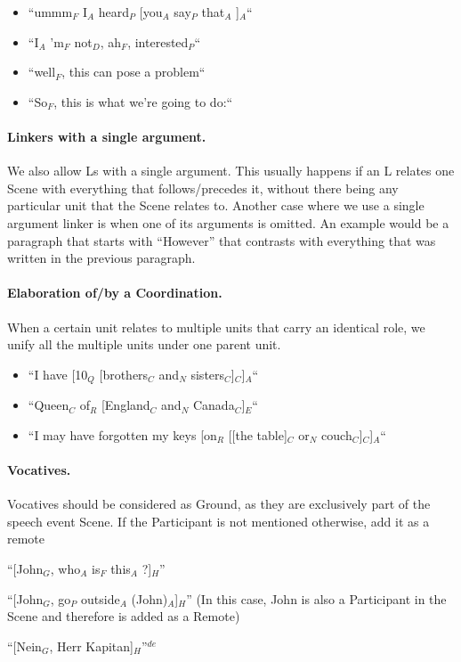 \documentclass[11pt]{article}
\newcommand{\be}{\begin{enumerate}}
\newcommand{\ee}{\end{enumerate}}
\newcommand{\german}[1]{{\color{red}#1$^{de}$}}
\begin{document}
{\begin{itemize}
\item 
``ummm$_F$ I$_A$ heard$_P$ [you$_A$ say$_P$ that$_A$ ]$_A$``
\item
``I$_A$ 'm$_F$ not$_D$, ah$_F$, interested$_P$``
\item
``well$_F$, this can pose a problem``
\item
``So$_F$, this is what we're going to do:``
\end{itemize}

}


\paragraph{Linkers with a single argument.}
We also allow Ls with a single argument. This usually happens if an L relates one Scene with everything that follows/precedes it, 
without there being any particular unit that the Scene relates to. Another case where we use a single argument linker is when one of its arguments is omitted.
An example would be a paragraph that starts with ``However'' that contrasts with everything that was written in the previous paragraph.

\paragraph {Elaboration of/by a Coordination.} When a certain unit relates to multiple units that carry an identical role, we unify all the multiple units under one parent unit. 

\begin {itemize}
\item
``I have [10$_Q$ [brothers$_C$ and$_N$ sisters$_C$]$_C$]$_A$`` 
\item
``Queen$_C$ of$_R$ [England$_C$ and$_N$ Canada$_C$]$_E$`` 
\item
``I may have forgotten my keys [on$_R$ [[the table]$_C$ or$_N$ couch$_C$]$_C$]$ _A$``
\end{itemize}

\paragraph{Vocatives.} Vocatives should be considered as Ground, as they are exclusively part of the speech event Scene.
If the Participant is not mentioned otherwise, add it as a remote

\be 
\item
``[John$_G$, who$_A$ is$_F$ this$_A$ ?]$_H$''
\item  ``[John$_G$, go$_P$ outside$_A$ (John)$_A$]$_H$'' (In this case, John is also a Participant in the Scene and therefore is added as a Remote)
\german{\item
``[Nein$_G$, Herr Kapitan]$_H$''}
\ee
\end{document}
